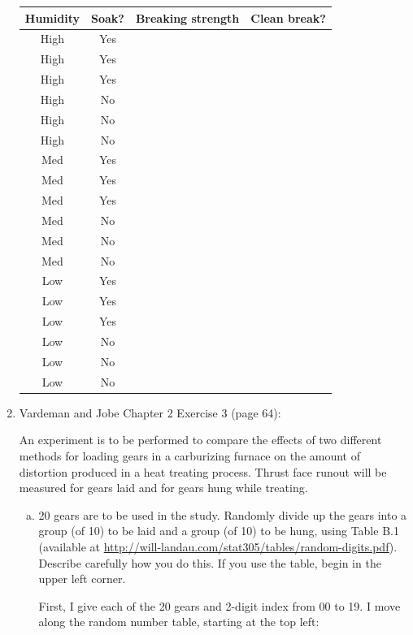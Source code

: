 \documentclass{article}\usepackage{graphicx, color}
\providecommand{\q}{$\quad$ \newline}
\numberwithin{equation}{section}
\begin{document}
\begin{flushleft}
\begin{enumerate}[1. ]
\begin{center}
\begin{tabular}{cccc}
Humidity & Soak? & Breaking strength & Clean break? \\ \hline
High & Yes &  &  \\ 
High & Yes &  &  \\ 
High & Yes &  &  \\ 
High & No &  &  \\ 
High & No &  &  \\ 
High & No &  &  \\ 
Med & Yes &  &  \\ 
Med & Yes &  &  \\ 
Med & Yes &  &  \\ 
Med & No &  &  \\ 
Med & No &  &  \\ 
Med & No &  &  \\ 
Low & Yes &  &  \\
Low & Yes &  &  \\
Low & Yes &  &  \\
Low & No &  &  \\ 
Low & No &  &  \\  
Low & No &  &  \\ 
\end{tabular}
\end{center}

\color{black}


\item  Vardeman and Jobe Chapter 2 Exercise 3 (page 64): 

An experiment is to be performed to compare the effects of two different methods for loading gears in a carburizing furnace on the amount of distortion produced in a heat treating process. Thrust face runout will be measured for gears laid and for gears hung while treating.

\begin{enumerate}[a. ]
\item 20 gears are to be used in the study. Randomly divide up the gears into a group (of 10) to be laid and a group (of 10) to be hung, using Table B.1 (available at \href{http://will-landau.com/stat305/tables/random-digits.pdf}{http://will-landau.com/stat305/tables/random-digits.pdf}). Describe carefully how you do this. If you use the table, begin in the upper left corner.

\color{red}

First, I give each of the 20 gears and 2-digit index from 00 to 19. I move along the random number table, starting at the top left: \q


\end{enumerate}
\end{enumerate}
\end{flushleft}
\end{document}
